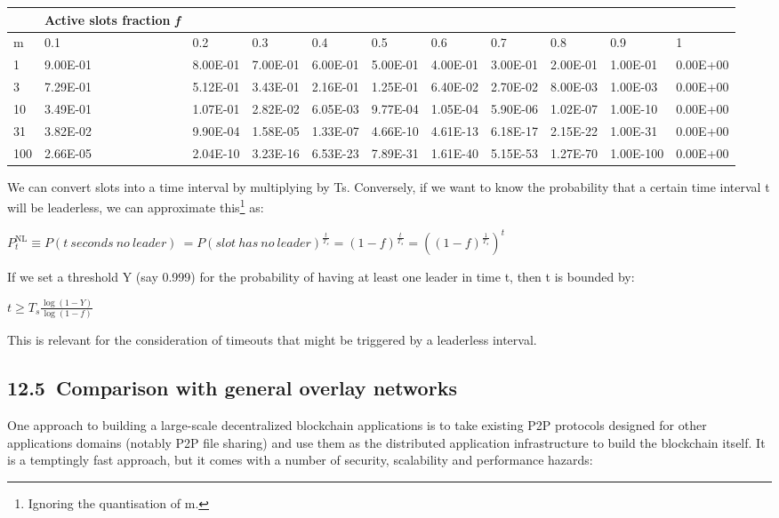 \documentclass[11pt,a4paper]{article}
\begin{document}
\begin{longtable}[]{@{}lllllllllll@{}}
\toprule
& \textbf{Active slots fraction \emph{f}} & & & & & & & &
&\tabularnewline
\midrule
\endhead
m & 0.1 & 0.2 & 0.3 & 0.4 & 0.5 & 0.6 & 0.7 & 0.8 & 0.9 &
1\tabularnewline
1 & 9.00E-01 & 8.00E-01 & 7.00E-01 & 6.00E-01 & 5.00E-01 & 4.00E-01 &
3.00E-01 & 2.00E-01 & 1.00E-01 & 0.00E+00\tabularnewline
3 & 7.29E-01 & 5.12E-01 & 3.43E-01 & 2.16E-01 & 1.25E-01 & 6.40E-02 &
2.70E-02 & 8.00E-03 & 1.00E-03 & 0.00E+00\tabularnewline
10 & 3.49E-01 & 1.07E-01 & 2.82E-02 & 6.05E-03 & 9.77E-04 & 1.05E-04 &
5.90E-06 & 1.02E-07 & 1.00E-10 & 0.00E+00\tabularnewline
31 & 3.82E-02 & 9.90E-04 & 1.58E-05 & 1.33E-07 & 4.66E-10 & 4.61E-13 &
6.18E-17 & 2.15E-22 & 1.00E-31 & 0.00E+00\tabularnewline
100 & 2.66E-05 & 2.04E-10 & 3.23E-16 & 6.53E-23 & 7.89E-31 & 1.61E-40 &
5.15E-53 & 1.27E-70 & 1.00E-100 & 0.00E+00\tabularnewline
\bottomrule
\end{longtable}

We can convert slots into a time interval by multiplying by Ts.
Conversely, if we want to know the probability that a certain time
interval t will be leaderless, we can approximate this\footnote{Ignoring
  the quantisation of m.} as:

\(P_{t}^{\text{NL}} \equiv P(t\ seconds\ no\ leader)\  = {P(slot\ has\ no\ leader)}^{\frac{t}{T_{s}}} = \left( 1 - f \right)^{\frac{t}{T_{s}}} = \left( \left( 1 - f \right)^{\frac{1}{T_{s}}} \right)^{t}\)

If we set a threshold Y (say 0.999) for the probability of having at
least one leader in time t, then t is bounded by:

\(t \geq T_{s}\frac{\log\left( 1 - Y \right)}{\log\left( 1 - f \right)}\)

This is relevant for the consideration of timeouts that might be
triggered by a leaderless interval.

\hypertarget{comparison-with-general-overlay-networks}{%
\subsection{​12.5​~Comparison with general overlay networks
}\label{comparison-with-general-overlay-networks}}

One approach to building a large-scale decentralized blockchain
applications is to take existing P2P protocols designed for other
applications domains (notably P2P file sharing) and use them as the
distributed application infrastructure to build the blockchain itself.
It is a temptingly fast approach, but it comes with a number of
security, scalability and performance hazards:
\end{document}

